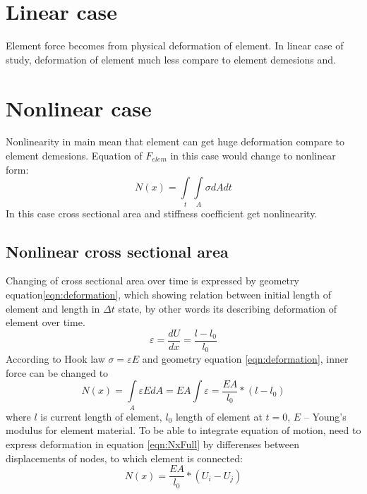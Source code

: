 \documentclass[12pt]{report}
\begin{document}
\section{Linear case}\par
Element force becomes from physical deformation of element. In linear case of study, deformation of element much
less compare to element demesions and.

\section{Nonlinear case}
Nonlinearity in main mean that element can get huge deformation compare to element demesions. Equation of $F_{elem}$
in this case  would change to nonlinear form:
\begin{equation}\label{eqn:nNx}
  N(x)= \int\limits_t\int\limits_A \sigma dAdt
\end{equation}
In this case cross sectional area and stiffness coefficient get nonlinearity. \par
\subsection{Nonlinear cross sectional area}\par
Changing of cross sectional area over time is expressed by geometry equation\eqref{eqn:deformation}, which showing 
relation between initial length of element and length in $\Delta t$ state, by other words its describing deformation 
of element over time.
\begin{equation}\label{eqn:deformation}
  \varepsilon=\frac{dU}{dx}=\frac{l-l_0}{l_0}
\end{equation}
According to Hook law $\sigma=\varepsilon E$ and geometry equation \eqref{eqn:deformation}, inner force can be changed to
\begin{equation}\label{eqn:NxFull}
  N(x)= \int\limits_A \varepsilon EdA=EA\int \varepsilon=\frac{EA}{l_0}*(l-l_0)
\end{equation}
where $l$ is current length of element, $l_0$ length of element at $t=0$, $E$ – Young’s modulus for element material.
To be able to integrate equation of motion, need to express deformation in equation \eqref{eqn:NxFull} by differenses 
between displacements of nodes, to which element is connected:
\begin{equation}\label{eqn:NxWdispl}
  N(x)=\frac{EA}{l_0}*(U_{i}-U_{j})
\end{equation}\par
\end{document}

